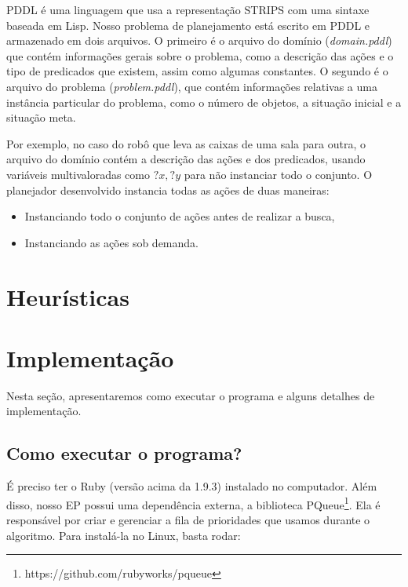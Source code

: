 \documentclass[12pt,a4paper]{article}
\begin{document}
PDDL é uma linguagem que usa a representação STRIPS com uma sintaxe baseada em Lisp. 
Nosso problema de planejamento está escrito em PDDL e armazenado em dois arquivos. O primeiro é o arquivo do domínio (\textit{domain.pddl}) que contém informações gerais sobre o problema, como a descrição das ações e o tipo de predicados que existem, assim como algumas constantes. O segundo é o arquivo do problema (\textit{problem.pddl}), que contém informações relativas a uma instância particular do problema, como o número de objetos, a situação inicial e a situação meta.

Por exemplo, no caso do robô que leva as caixas de uma sala para outra, o arquivo do domínio contém a descrição das ações e dos predicados, usando variáveis multivaloradas como $?x, ?y$ para não instanciar todo o conjunto. 
O planejador desenvolvido instancia todas as ações de duas maneiras:
\begin{itemize}
\item Instanciando todo o conjunto de ações antes de realizar a busca,
\item Instanciando as ações sob demanda.
\end{itemize}


\section{Heurísticas}\label{heuristicas}






\section{Implementação}\label{implementacao}

Nesta seção, apresentaremos como executar o programa e alguns detalhes de implementação.

\subsection{Como executar o programa?}\label{implementacao:execucao}
É preciso ter o Ruby (versão acima da 1.9.3) instalado no computador. Além disso, nosso EP possui uma dependência externa, a biblioteca PQueue\footnote{https://github.com/rubyworks/pqueue}. Ela é responsável por criar e gerenciar a fila de prioridades que usamos durante o algoritmo. Para instalá-la no Linux, basta rodar:
\end{document}
